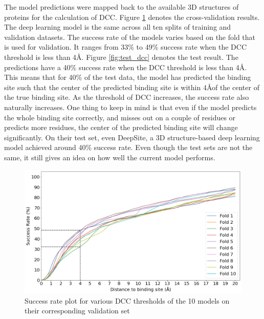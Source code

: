 \documentclass[journal=jacsat,manuscript=article]{achemso}
\begin{document}
The model predictions were mapped back to the available 3D structures of proteins for the calculation of DCC. Figure \ref{fig:valid_dcc} denotes the cross-validation results. The deep learning model is the same across all ten splits of training and validation datasets. The success rate of the models varies based on the fold that is used for validation. It ranges from 33\% to 49\% success rate when the DCC threshold is less than 4\AA. Figure \ref{fig:test_dcc} denotes the test result. The predictions have a 40\% success rate when the DCC threshold is less than 4\AA. This means that for 40\% of the test data, the model has predicted the binding site such that the center of the predicted binding site is within 4\AA of the center of the true binding site. As the threshold of DCC increases, the success rate also naturally increases. One thing to keep in mind is that even if the model predicts the whole binding site correctly, and misses out on a couple of residues or predicts more residues, the center of the predicted binding site will change significantly. On their test set, even DeepSite, a 3D structure-based deep learning model \cite{jimenez2017deepsite} achieved around 40\% success rate. Even though the test sets are not the same, it still gives an idea on how well the current model performs.

\vspace{10 mm}
\begin{figure}
    \centering
    \noindent\includegraphics[scale=0.45]{valid_dcc.png}
    \caption{\centering Success rate plot for various DCC thresholds of the 10 models on their corresponding validation set}
    \label{fig:valid_dcc}
\end{figure}
\end{document}
